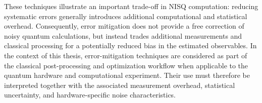 These techniques illustrate an important trade-off in NISQ computation: reducing systematic errors generally introduces additional computational and statistical overhead. Consequently, error mitigation does not provide a free correction of noisy quantum calculations, but instead trades additional measurements and classical processing for a potentially reduced bias in the estimated observables.
In the context of this thesis, error-mitigation techniques are considered as part of the classical post-processing and optimization workflow when applicable to the quantum hardware and computational experiment. Their use must therefore be interpreted together with the associated measurement overhead, statistical uncertainty, and hardware-specific noise characteristics.